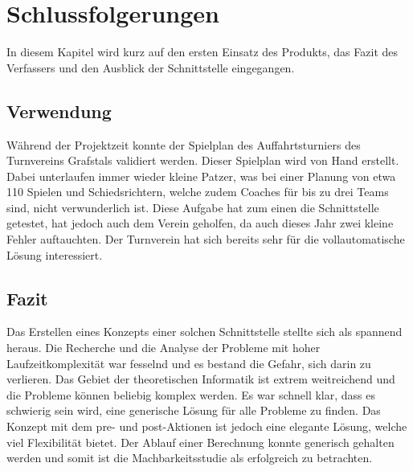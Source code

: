 %
%


\chapter{Schlussfolgerungen}\label{chap.Schlussfolgerungen}
In diesem Kapitel wird kurz auf den ersten Einsatz des Produkts, das Fazit des Verfassers und den Ausblick der Schnittstelle eingegangen.

\section{Verwendung}\label{fazit_verwendung}
Während der Projektzeit konnte der Spielplan des Auffahrtsturniers des Turnvereins Grafstals validiert werden. Dieser Spielplan wird von Hand erstellt. Dabei unterlaufen immer wieder 
kleine Patzer, was bei einer Planung von etwa 110 Spielen und Schiedsrichtern, welche zudem Coaches für bis zu drei Teams sind, nicht verwunderlich ist. Diese Aufgabe hat zum einen die Schnittstelle 
getestet, hat jedoch auch dem Verein geholfen, da auch dieses Jahr zwei kleine Fehler auftauchten. Der Turnverein hat sich bereits sehr für die vollautomatische Lösung interessiert.

\section{Fazit}\label{fazit}

Das Erstellen eines Konzepts einer solchen Schnittstelle stellte sich als spannend heraus. Die Recherche und die Analyse der Probleme mit hoher Laufzeitkomplexität war fesselnd und es 
bestand die Gefahr, sich darin zu verlieren. Das Gebiet der theoretischen Informatik ist extrem weitreichend und die Probleme können beliebig komplex werden. Es war schnell klar, dass es schwierig 
sein wird, eine generische Lösung für alle Probleme zu finden. Das Konzept mit dem pre- und post-Aktionen ist jedoch eine elegante Lösung, welche viel Flexibilität bietet. Der Ablauf einer Berechnung 
konnte generisch gehalten werden und somit ist die Machbarkeitsstudie als erfolgreich zu betrachten.

